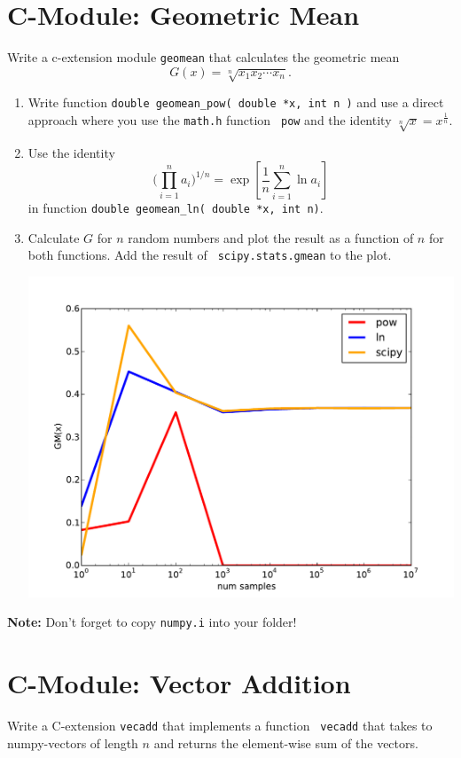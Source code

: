 \documentclass[12pt]{scrartcl}
\begin{document}
\section{C-Module: Geometric Mean}
Write a c-extension module {\tt geomean} that calculates the
  geometric mean
  \[
  G(x) = \sqrt[n]{x_1x_2\cdots x_n}.
  \]
\begin{enumerate}
\item Write function {\tt double geomean\_pow( double *x, int n )} and
  use a direct approach where you use the {\tt math.h} function {\tt
    pow} and the identity $\sqrt[n]{x}=x^{\frac{1}{n}}$.
\item Use the identity 
  \[
  \bigg(\prod_{i=1}^na_i \bigg)^{1/n} =
  \exp\left[\frac1n\sum_{i=1}^n\ln a_i\right]
  \]
  in function {\tt double geomean\_ln( double *x, int n)}.
\item Calculate $G$ for $n$ random numbers and plot the result as a
  function of $n$ for both functions. Add the result of {\tt
    scipy.stats.gmean} to the plot.
  
  \includegraphics[width=.6\textwidth]{pics/geomean}
\end{enumerate}


{\bf Note:} Don't forget to copy {\tt numpy.i} into your folder!

\section{C-Module: Vector Addition}

Write a C-extension {\tt vecadd} that implements a function {\tt
  vecadd} that takes to numpy-vectors of length $n$ and returns the
element-wise sum of the vectors.
\end{document}
